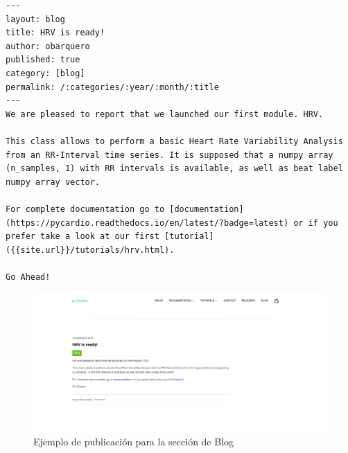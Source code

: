 \begin{lstlisting}[caption=Ejemplo de publicación de Blog,label={code:blogMD}]
---
layout: blog
title: HRV is ready!
author: obarquero
published: true
category: [blog]
permalink: /:categories/:year/:month/:title
---
We are pleased to report that we launched our first module. HRV.

This class allows to perform a basic Heart Rate Variability Analysis from an RR-Interval time series. It is supposed that a numpy array (n_samples, 1) with RR intervals is available, as well as beat label numpy array vector.

For complete documentation go to [documentation](https://pycardio.readthedocs.io/en/latest/?badge=latest) or if you prefer take a look at our first [tutorial]({{site.url}}/tutorials/hrv.html).

Go Ahead!
\end{lstlisting}


\begin{figure}[H]
    \centering
    \includegraphics[width=\textwidth]{img/blog_example.png}
    \caption{Ejemplo de publicación para la sección de Blog}
    \label{fig:blogExample}
\end{figure}